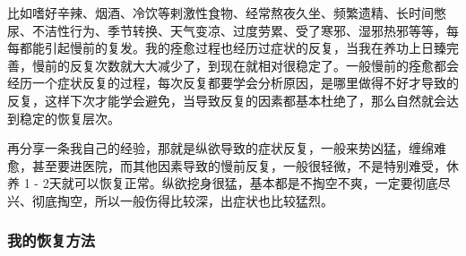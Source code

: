 比如嗜好辛辣、烟酒、冷饮等剌激性食物、经常熬夜久坐、频繁遗精、长时间憋尿、不洁性行为、季节转换、天气变凉、过度劳累、受了寒邪、湿邪热邪等等，每每都能引起慢前的复发。我的痊愈过程也经历过症状的反复，当我在养功上日臻完善，慢前的反复次数就大大减少了，到现在就相对很稳定了。一般慢前的痊愈都会经历一个症状反复的过程，每次反复都要学会分析原因，是哪里做得不好才导致的反复，这样下次才能学会避免，当导致反复的因素都基本杜绝了，那么自然就会达到稳定的恢复层次。

再分享一条我自己的经验，那就是纵欲导致的症状反复，一般来势凶猛，缠绵难愈，甚至要进医院，而其他因素导致的慢前反复，一般很轻微，不是特别难受，休养 1 - 2天就可以恢复正常。纵欲挖身很猛，基本都是不掏空不爽，一定要彻底尽兴、彻底掏空，所以一般伤得比较深，出症状也比较猛烈。

\subsubsection{我的恢复方法}


